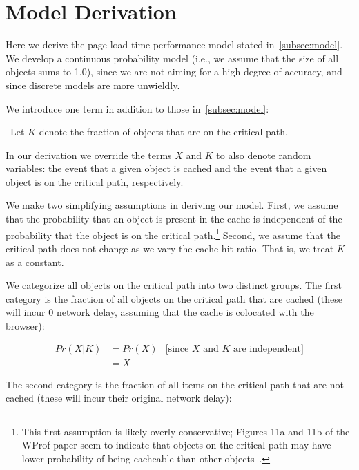 \section{Model Derivation}
\label{sec:appendix}

Here we derive the page load time performance model stated in~\ref{subsec:model}. We
develop a continuous probability model (i.e., we assume that the size of all
objects sums to 1.0), since we are not aiming for a high degree of accuracy,
and since discrete models are more unwieldly.


We introduce one term in addition to those in~\ref{subsec:model}:

\noindent--Let $K$ denote the fraction of objects that are on the critical path.

In our derivation we override the terms $X$ and $K$ to also denote random
variables: the event that a given object is cached and the event that a given
object is on the critical path, respectively.

We make two simplifying assumptions in deriving our model. First, we assume that the probability that an
object is present in the cache is independent of the probability that the
object is on the critical path.\footnote{
This first assumption is likely overly conservative; Figures 11a and 11b of the
WProf paper seem to indicate that objects on the critical path may have lower
probability of being cacheable than other objects~\cite{wang2013demystifying}.}
Second, we assume that the critical path does not change as we vary the cache hit
ratio. That is, we treat $K$ as a constant.

We categorize all objects on the critical path into two distinct groups.
The first category is the fraction of all objects on the critical path that are cached (these
will incur 0 network delay, assuming that the cache is colocated with the
browser):

\begin{align*}
Pr(X|K) & =  Pr(X) & \text{[since $X$ and $K$ are independent]} \\
& = X &
\end{align*}

The second category is the fraction of all items on the critical path that are not cached (these will incur their original network delay):

